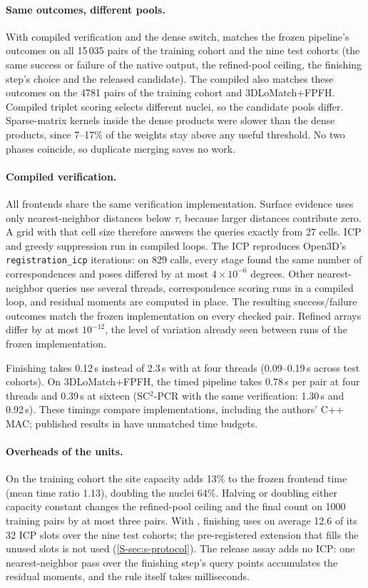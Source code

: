 \paragraph{Same outcomes, different pools.} With compiled verification and the dense switch, \ls{} matches the frozen pipeline's outcomes on all 15\,035 pairs of the training cohort and the nine test cohorts (the same success or failure of the native output, the refined-pool ceiling, the finishing step's choice and the released candidate). The compiled \ngr{} also matches these outcomes on the 4781 pairs of the training cohort and 3DLoMatch+FPFH. Compiled triplet scoring selects different nuclei, so the candidate pools differ. Sparse-matrix kernels inside the dense products were slower than the dense products, since 7--17\% of the weights stay above any useful threshold. No two phases coincide, so duplicate merging saves no work.

\paragraph{Compiled verification.} All frontends share the same verification implementation. Surface evidence uses only nearest-neighbor distances below $\tau$, because larger distances contribute zero. A grid with that cell size therefore answers the queries exactly from 27 cells. ICP and greedy suppression run in compiled loops. The ICP reproduces Open3D's \texttt{registration\_icp} iterations: on 829 calls, every stage found the same number of correspondences and poses differed by at most $4\times10^{-6}$ degrees. Other nearest-neighbor queries use several threads, correspondence scoring runs in a compiled loop, and residual moments are computed in place. The resulting success/failure outcomes match the frozen implementation on every checked pair. Refined arrays differ by at most $10^{-12}$, the level of variation already seen between runs of the frozen implementation.

Finishing takes 0.12\,s instead of 2.3\,s with \ls{} at four threads (0.09--0.19\,s across test cohorts). On 3DLoMatch+FPFH, the timed pipeline takes 0.78\,s per pair at four threads and 0.39\,s at sixteen (SC$^2$-PCR with the same verification: 1.30\,s and 0.92\,s). These timings compare implementations, including the authors' C++ MAC; published results in  have unmatched time budgets.

\paragraph{Overheads of the units.} On the training cohort the site capacity adds 13\% to the frozen frontend time (mean time ratio 1.13), doubling the nuclei 64\%. Halving or doubling either capacity constant changes the refined-pool ceiling and the final count on 1000 training pairs by at most three pairs. With \ls{}, finishing uses on average 12.6 of its 32 ICP slots over the nine test cohorts; the pre-registered extension that fills the unused slots is not used (\cref{S-sec:s-protocol}). The release assay adds no ICP: one nearest-neighbor pass over the finishing step's query points accumulates the residual moments, and the rule itself takes milliseconds.

